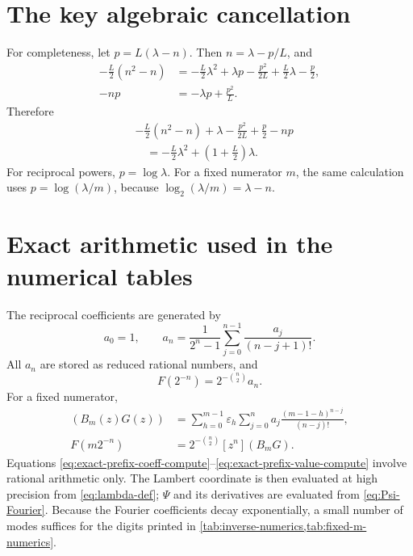 \documentclass[11pt,oneside]{article}
\theoremstyle{definition}
\theoremstyle{remark}
\newcommand{\TM}{\varepsilon}
\begin{document}
\appendix

\section{The key algebraic cancellation}
\label{app:algebra}

For completeness, let $p=L(\lambda-n)$.  Then $n=\lambda-p/L$, and
\begin{align*}
 -\frac L2(n^2-n)
 &=-\frac L2\lambda^2+\lambda p-\frac{p^2}{2L}
 +\frac L2\lambda-\frac p2,\\
 -np&=-\lambda p+\frac{p^2}{L}.
\end{align*}
Therefore
\begin{align*}
 &-\frac L2(n^2-n)+\lambda-\frac{p^2}{2L}+\frac p2-np\\
 &\quad=-\frac L2\lambda^2+
 \left(1+\frac L2\right)\lambda.
\end{align*}
For reciprocal powers, $p=\log\lambda$.  For a fixed numerator $m$, the same calculation uses
$p=\log(\lambda/m)$, because
$\log_2(\lambda/m)=\lambda-n$.

\section{Exact arithmetic used in the numerical tables}
\label{app:numerics}

The reciprocal coefficients are generated by
\begin{equation}
 a_0=1,
 \qquad
 a_n=\frac1{2^n-1}
 \sum_{j=0}^{n-1}\frac{a_j}{(n-j+1)!}.
\end{equation}
All $a_n$ are stored as reduced rational numbers, and
\begin{equation}
 F(2^{-n})=2^{-\binom n2}a_n.
\end{equation}
For a fixed numerator,
\begin{align}
 [z^n](B_m(z)G(z))
 &=\sum_{h=0}^{m-1}\TM_h
 \sum_{j=0}^{n}a_j
 \frac{(m-1-h)^{n-j}}{(n-j)!},                             \label{eq:exact-prefix-coeff-compute}\\
 F(m2^{-n})
 &=2^{-\binom n2}[z^n](B_mG).                              \label{eq:exact-prefix-value-compute}
\end{align}
Equations \eqref{eq:exact-prefix-coeff-compute}--\eqref{eq:exact-prefix-value-compute} involve rational arithmetic only.  The Lambert coordinate is then evaluated at high precision from
\eqref{eq:lambda-def}; $\Psi$ and its derivatives are evaluated from
\eqref{eq:Psi-Fourier}.  Because the Fourier coefficients decay exponentially, a small number of modes suffices for the digits printed in \cref{tab:inverse-numerics,tab:fixed-m-numerics}.
\end{document}
